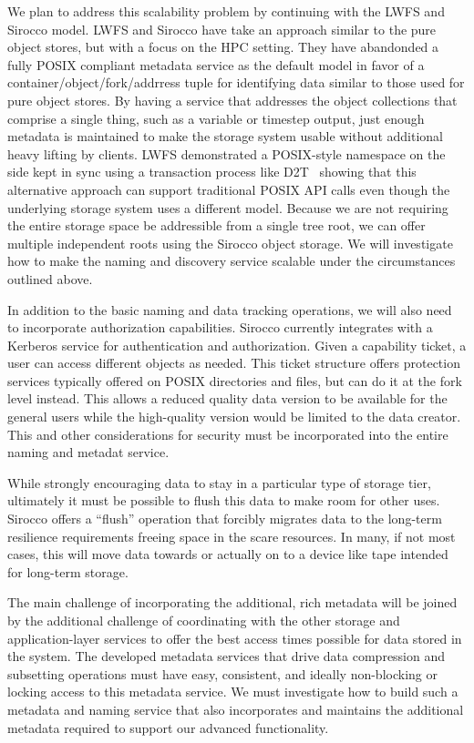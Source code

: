 We plan to address this scalability problem by continuing with the LWFS and
Sirocco model. LWFS and Sirocco have take an approach similar to the pure
object stores, but with a focus on the HPC setting. They have abandonded a
fully POSIX compliant metadata service as the default model in favor of a
container/object/fork/addrress tuple for identifying data similar to those used
for pure object stores. By having a service that addresses the object
collections that comprise a single thing, such as a variable or timestep
output, just enough metadata is maintained to make the storage system usable
without additional heavy lifting by clients.  LWFS demonstrated a POSIX-style
namespace on the side kept in sync using a transaction process like
D2T~\cite{d2t} showing that this alternative approach can support traditional
POSIX API calls even though the underlying storage system uses a different
model. Because we are not requiring the entire storage space be addressible
from a single tree root, we can offer multiple independent roots using the
Sirocco object storage. We will investigate how to make the naming and
discovery service scalable under the circumstances outlined above.

In addition to the basic naming and data tracking operations, we will also need
to incorporate authorization capabilities. Sirocco currently integrates with a
Kerberos service for authentication and authorization. Given a capability
ticket, a user can access different objects as needed. This ticket structure
offers protection services typically offered on POSIX directories and files,
but can do it at the fork level instead. This allows a reduced quality data
version to be available for the general users while the high-quality version
would be limited to the data creator. This and other considerations for
security must be incorporated into the entire naming and metadat service.

While strongly encouraging data to stay in a particular type of storage tier,
ultimately it must be possible to flush this data to make room for other uses.
Sirocco offers a ``flush'' operation that forcibly migrates data to the
long-term resilience requirements freeing space in the scare resources. In
many, if not most cases, this will move data towards or actually on to a device
like tape intended for long-term storage.

The main challenge of incorporating the additional, rich metadata will be
joined by the additional challenge of coordinating with the other storage and
application-layer services to offer the best access times possible for data
stored in the system. The developed metadata services that drive data
compression and subsetting operations must have easy, consistent, and ideally
non-blocking or locking access to this metadata service. We must investigate
how to build such a metadata and naming service that also incorporates and
maintains the additional metadata required to support our advanced
functionality.

